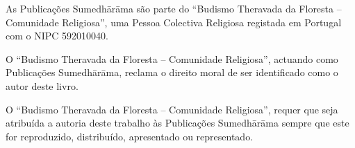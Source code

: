 {As Publicações Sumedhārāma são parte do “Budismo Theravada da Floresta -- Comunidade Religiosa”, uma Pessoa Colectiva Religiosa registada em Portugal com o NIPC 592010040.

O “Budismo Theravada da Floresta -- Comunidade Religiosa”, actuando como Publicações Sumedhārāma, reclama o direito moral de ser identiﬁcado como o autor deste livro.

O “Budismo Theravada da Floresta -- Comunidade Religiosa”, requer que seja atribuída a autoria deste trabalho às Publicações Sumedhārāma sempre que este for reproduzido, distribuído, apresentado ou representado.

}
